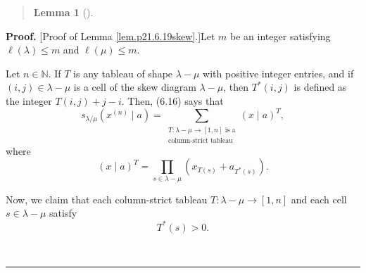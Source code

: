 \documentclass[numbers=enddot,12pt,final,onecolumn,notitlepage]{scrartcl}%
\newenvironment{statement}{\begin{quote}}{\end{quote}}
\theoremstyle{definition}
\newtheorem{lem}[theo]{Lemma}
\newenvironment{lemmain}[1][]
{\begin{statement}\begin{lem}[#1]}
{\end{lem}\end{statement}}
\newenvironment{proof}[1][Proof]{\noindent\textbf{#1.} }{\ \rule{0.5em}{0.5em}}
\newenvironment{lemmain}[1][Proof]{\noindent\textbf{#1.} }{\ \rule{0.5em}{0.5em}}
\newenvironment{noncompile}{}{}
\let\sumnonlimits\sum
\let\prodnonlimits\prod
\renewcommand{\sum}{\sumnonlimits\limits}
\renewcommand{\prod}{\prodnonlimits\limits}
\begin{document}
\begin{enumerate}
\begin{noncompile}
\begin{lemmain}
\end{lemmain}

\begin{proof}
[Proof of Lemma \ref{lem.p21.6.19skew}.]Let $m$ be an integer satisfying
$\ell\left(  \lambda\right)  \leq m$ and $\ell\left(  \mu\right)  \leq m$.

Let $n\in\mathbb{N}$. If $T$ is any tableau of shape $\lambda-\mu$ with
positive integer entries, and if $\left(  i,j\right)  \in\lambda-\mu$ is a
cell of the skew diagram $\lambda-\mu$, then $T^{\ast}\left(  i,j\right)  $ is
defined as the integer $T\left(  i,j\right)  +j-i$. Then, (6.16) says that%
\begin{equation}
s_{\lambda/\mu}\left(  x^{\left(  n\right)  }\mid a\right)  =\sum
_{\substack{T:\lambda-\mu\rightarrow\left[  1,n\right]  \text{ is
a}\\\text{column-strict tableau}}}\left(  x\mid a\right)  ^{T},
\label{pf.lem.p21.6.19skew.1}%
\end{equation}
where%
\begin{equation}
\left(  x\mid a\right)  ^{T}=\prod_{s\in\lambda-\mu}\left(  x_{T\left(
s\right)  }+a_{T^{\ast}\left(  s\right)  }\right)  .
\label{pf.lem.p21.6.19skew.2}%
\end{equation}


Now, we claim that each column-strict tableau $T:\lambda-\mu\rightarrow\left[
1,n\right]  $ and each cell $s\in\lambda-\mu$ satisfy%
\begin{equation}
T^{\ast}\left(  s\right)  >0. \label{pf.lem.p21.6.19skew.pos}%
\end{equation}



\end{proof}
\end{noncompile}
\end{enumerate}
\end{document}
